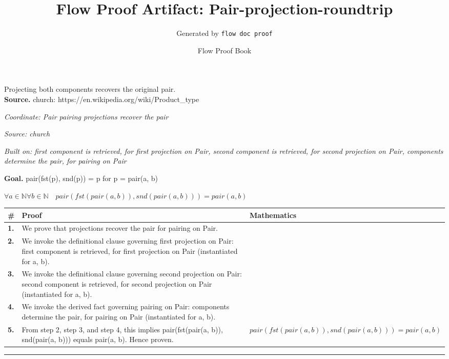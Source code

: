 \documentclass[11pt]{article}
\title{Flow Proof Artifact: Pair-projection-roundtrip}
\author{Generated by \texttt{flow doc proof}}
\date{Flow Proof Book}
\theoremstyle{definition}
\begin{document}
\maketitle
Projecting both components recovers the original pair.\\[0.5em]
\textbf{Source.} church: https://en.wikipedia.org/wiki/Product\_type\\[0.5em]
\bigskip
{}\par
\smallskip\noindent\textit{Coordinate: Pair \cdot pairing \cdot projections recover the pair}\par
\smallskip\noindent\textit{Source: church}\par
\smallskip\noindent\textit{Built on: first component is retrieved, for first projection on Pair, second component is retrieved, for second projection on Pair, components determine the pair, for pairing on Pair}\par
\medskip
\noindent\textbf{Goal.} pair(fst(p), snd(p)) = p for p = pair(a, b)\par
\noindent$\displaystyle \forall a \in \mathbb{N} \forall b \in \mathbb{N}\quad pair(fst(pair(a, b)), snd(pair(a, b))) = pair(a, b)$\par
\medskip
\noindent
\begin{tabular}{@{} >{\raggedright\arraybackslash}p{} >{\raggedright\arraybackslash}p{} >{\raggedleft\arraybackslash}p{} @{}}
\textbf{\#} & \textbf{Proof} & \textbf{Mathematics} \\
\midrule
\textbf{1.} & We prove that projections recover the pair for pairing on Pair. & \\[0.45em]
\textbf{2.} & We invoke the definitional clause governing first projection on Pair: first component is retrieved, for first projection on Pair (instantiated for a, b). & \\[0.45em]
\textbf{3.} & We invoke the definitional clause governing second projection on Pair: second component is retrieved, for second projection on Pair (instantiated for a, b). & \\[0.45em]
\textbf{4.} & We invoke the derived fact governing pairing on Pair: components determine the pair, for pairing on Pair (instantiated for a, b). & \\[0.45em]
\textbf{5.} & From step 2, step 3, and step 4, this implies pair(fst(pair(a, b)), snd(pair(a, b))) equals pair(a, b). Hence proven. & $\displaystyle pair(fst(pair(a, b)), snd(pair(a, b))) = pair(a, b)$ \\[0.45em]
\bottomrule
\end{tabular}
\label{thm:Pair-pairing-projections_recover_the_pair}
\par\medskip\hrule
\end{document}
